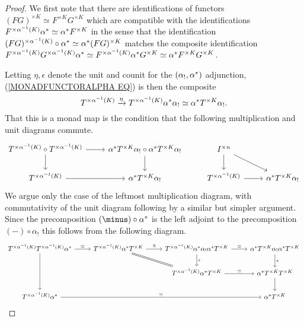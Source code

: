 \documentclass[a4paper,10pt]{article}%
\begin{document}
\begin{proof}
  We first note that there are identifications of functors
  $(FG)^{\times K} \simeq F^{\times K} G^{\times K}$ which are compatible with the identifications
  $F^{\times \alpha^{-1} (K)} \alpha^{\**} \simeq \alpha^{\**} F^{\times K}$
  in the sense that the identification
  $(F G)^{\times \alpha^{-1} (K)} \circ \alpha^{\**} \simeq 
  \alpha^{\**} (FG)^{\times K}$
  matches the composite identification
  $F^{\times \alpha^{-1} (K)} G^{\times \alpha^{-1} (K)} \alpha^{\**} \simeq
  F^{\times \alpha^{-1} (K)}\alpha^{\**}G^{\times K} \simeq
  \alpha^{\**} F^{\times K} G^{\times K}$.

  Letting $\eta, \epsilon$ denote the unit and counit for the 
  $(\alpha_{!},\alpha^{\**})$ adjunction, 
  (\ref{MONADFUNCTORALPHA EQ})
  is then the composite
  \[
  T^{\times \alpha^{-1} (K)} \xrightarrow{\eta} 
  T^{\times \alpha^{-1} (K)} \alpha^{\**} \alpha_{!} \simeq
  \alpha^{\**} T^{\times K}\alpha_{!}.
  \]
  That this is a monad map is the condition that the following multiplication and unit diagrams commute.
  \[
  \begin{tikzcd}
    T^{\times \alpha^{-1} (K)} \circ T^{\times \alpha^{-1} (K)} \ar{d} \ar{r} &
    \alpha^{\**} T^{\times K} \alpha_{!} \circ 
    \alpha^{\**} T^{\times K} \alpha_{!} \ar{d} &
    I^{\times n} \ar{d} \ar{rd}& 	
    \\
    T^{\times \alpha^{-1} (K)} \ar{r} &
    \alpha^{\**} T^{\times K} \alpha_{!} &
    T^{\times \alpha^{-1} (K)} \ar{r} &
    \alpha^{\**} T^{\times K} \alpha_{!}
  \end{tikzcd}
  \]
  We argue only the case of the leftmost multiplication diagram, with commutativity of the unit diagram following by a similar but simpler argument. Since the precomposition
  $(\minus) \circ \alpha^{\**}$
  is the left adjoint to the precomposition
  $(\minus) \circ \alpha_{!}$
  this follows from the following diagram.
  \[
  \begin{tikzcd}
    T^{\times \alpha^{-1} (K)}  T^{\times \alpha^{-1} (K)}  \alpha^{*} \ar{r}{\simeq} \ar{dd}&
    T^{\times \alpha^{-1} (K)}  \alpha^{*}  T^{\times K} \ar{r}{\eta}
    \ar[equal]{rd} &
    T^{\times \alpha^{-1} (K)} \alpha^{\**} \alpha_{!} \alpha^{*} T^{\times K} \ar{d}{\epsilon} \ar{r}{\simeq}&
    \alpha^{\**} T^{\times K} \alpha_{!} \alpha^{\**}  T^{\times K} \ar{d}{\epsilon}
    \\
    & &
    T^{\times \alpha^{-1} (K)}  \alpha^{*}  T^{\times K} \ar{r}{\simeq} &
    \alpha^{*}  T^{\times K}  T^{\times K} \ar{d}
    \\
    T^{\times \alpha^{-1} (K)}  \alpha^{*} \ar{rrr}{\simeq} &&&
    \alpha^{*} T^{\times K}
  \end{tikzcd}
  \]
\end{proof}
\end{document}
